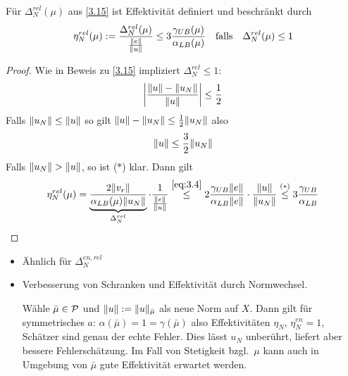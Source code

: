 \begin{satz}
	Für $\Delta_N^{rel}(\mu)$ aus \ref{3.15} ist Effektivität definiert und beschränkt durch
	\[
		\eta_N^{rel}(\mu) := \frac{\Delta_N^{rel}(\mu)}{\frac{\|e\|}{\|u\|}} \leq 3 \frac{\gamma_{UB}(\mu)}{\alpha_{LB}(\mu)} \quad \text{falls} \quad \Delta_N^{rel}(\mu) \leq 1
	\]

	\begin{proof}
		Wie in Beweis zu \ref{3.15} impliziert $\Delta_N^{rel} \leq 1$:
		\[
			\left| \frac{\|u\|-\|u_N\|}{\|u\|} \right| \leq \frac 1 2
		\]
		Falls $\|u_N\| \leq \|u\|$ so gilt $\|u\|-\|u_N\| \leq \frac 1 2 \|u_N\|$ also
		\[
			\|u\| \leq \frac 3 2 \|u_N\|
		\]
		Falls $\|u_N\| > \|u\|$, so ist ($*$) klar.
		Dann gilt
		\[
			\eta_N^{rel}(\mu) = \underbrace{\frac{2 \|v_r\|}{\alpha_{LB}(\mu) \|u_N\|}}_{\Delta_N^{rel}} \cdot \frac{1}{\frac{\|e\|}{\|u\|}} \stackrel{\eqref{eq:3.4}}{\leq} 2 \frac{\gamma_{UB} \|e\|}{\alpha_{LB} \|e\|} \cdot \frac{\|u\|}{\|u_N\|} \stackrel{(*)}{\leq} 3 \frac{\gamma_{UB}}{\alpha_{LB}}
		\]
	\end{proof}
\end{satz}

\begin{bem} \beginwithlistbem
	\begin{itemize}
		\item Ähnlich für $\Delta_N^{en,rel}$
		\item Verbesserung von Schranken und Effektivität durch Normwechsel.

			Wähle $\bar\mu \in \mathcal{P}$ und $\|u\| := \|u\|_{\bar\mu}$ als neue Norm auf $X$.
			Dann gilt für symmetrisches $a$: $\alpha(\bar\mu) = 1 = \gamma(\bar\mu)$ also Effektivitäten $\eta_N$, $\eta_N^{en} = 1$, Schätzer sind genau der echte Fehler.
			Dies lässt $u_N$ unberührt, liefert aber bessere Fehlerschätzung.
			Im Fall von Stetigkeit bzgl.\ $\mu$ kann auch in Umgebung von $\bar\mu$ gute Effektivität erwartet werden.
	\end{itemize}
\end{bem}

